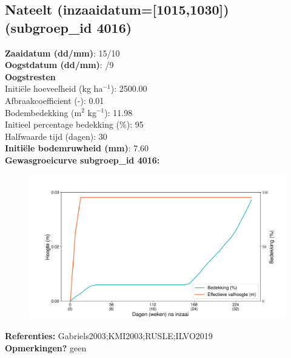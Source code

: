 \documentclass{article}
\begin{document}
 \subsection{Nateelt (inzaaidatum=[1015,1030]) (subgroep\_id 4016)} 
  \textbf{Zaaidatum (dd/mm)}: 15/10  \vspace{0.10cm} \\ 
  \textbf{Oogstdatum (dd/mm)}: /9  \vspace{0.10cm} \\ 
  \textbf{Oogstresten} \vspace{0.05cm} \\ 
  \tab Initi\"{e}le hoeveelheid (kg ha$^{-1}$): 2500.00 \vspace{0.05cm} \\ 
  \tab Afbraakcoefficient (-): 0.01 \vspace{0.05cm} \\ 
  \tab Bodembedekking (m$^2$ kg$^{-1}$): 11.98 \vspace{0.05cm} \\ 
  \tab Initieel percentage bedekking (\%): 95 \vspace{0.05cm} \\ 
  \tab Halfwaarde tijd (dagen): 30 \vspace{0.05cm} \\ 
  \textbf{Initi\"{e}le bodemruwheid (mm)}: 7.60 \vspace{0.05cm} \\ 
  \textbf{Gewasgroeicurve subgroep\_id 4016:} 
 \begin{center} \begin{figure}[H] \includegraphics[width=12.5cm]{temp/4016.png} \end{figure} \end{center} 
  \textbf{Referenties:} Gabriels2003;KMI2003;RUSLE;ILVO2019 \vspace{0.10cm} \\ 
  \textbf{Opmerkingen?} geen \vspace{0.10cm} \\ 
 \newpage 
\end{document}
